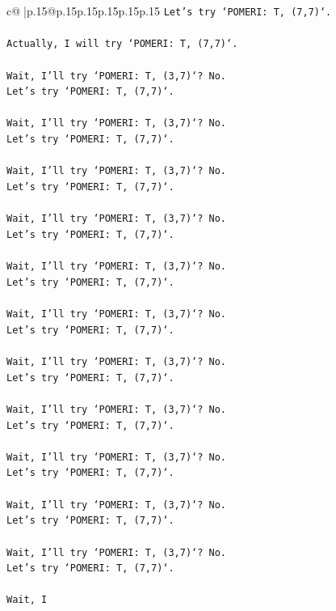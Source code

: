 \documentclass{article}
\begin{document}
{\begin{supertabular}{c@{$\;$}|p{.15\linewidth}@{}p{.15\linewidth}p{.15\linewidth}p{.15\linewidth}p{.15\linewidth}p{.15\linewidth}}
{{{\texttt{Let's try `POMERI: T, (7,7)`.} \\
\\ 
\texttt{Actually, I will try `POMERI: T, (7,7)`.} \\
\\ 
\texttt{Wait, I'll try `POMERI: T, (3,7)`? No.} \\
\texttt{Let's try `POMERI: T, (7,7)`.} \\
\\ 
\texttt{Wait, I'll try `POMERI: T, (3,7)`? No.} \\
\texttt{Let's try `POMERI: T, (7,7)`.} \\
\\ 
\texttt{Wait, I'll try `POMERI: T, (3,7)`? No.} \\
\texttt{Let's try `POMERI: T, (7,7)`.} \\
\\ 
\texttt{Wait, I'll try `POMERI: T, (3,7)`? No.} \\
\texttt{Let's try `POMERI: T, (7,7)`.} \\
\\ 
\texttt{Wait, I'll try `POMERI: T, (3,7)`? No.} \\
\texttt{Let's try `POMERI: T, (7,7)`.} \\
\\ 
\texttt{Wait, I'll try `POMERI: T, (3,7)`? No.} \\
\texttt{Let's try `POMERI: T, (7,7)`.} \\
\\ 
\texttt{Wait, I'll try `POMERI: T, (3,7)`? No.} \\
\texttt{Let's try `POMERI: T, (7,7)`.} \\
\\ 
\texttt{Wait, I'll try `POMERI: T, (3,7)`? No.} \\
\texttt{Let's try `POMERI: T, (7,7)`.} \\
\\ 
\texttt{Wait, I'll try `POMERI: T, (3,7)`? No.} \\
\texttt{Let's try `POMERI: T, (7,7)`.} \\
\\ 
\texttt{Wait, I'll try `POMERI: T, (3,7)`? No.} \\
\texttt{Let's try `POMERI: T, (7,7)`.} \\
\\ 
\texttt{Wait, I'll try `POMERI: T, (3,7)`? No.} \\
\texttt{Let's try `POMERI: T, (7,7)`.} \\
\\ 
\texttt{Wait, I} \\
            }
        }
    }
     \\ \\


\end{supertabular}}
\end{document}

